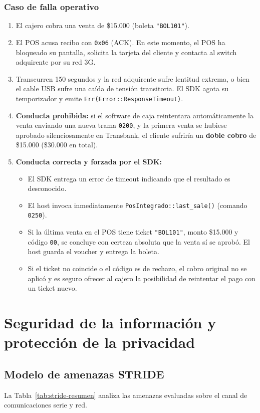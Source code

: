 \documentclass{../../plantilla/raysac-informe}
\begin{document}
\subsubsection{Caso de falla operativo}
\begin{enumerate}
  \item El cajero cobra una venta de \$15.000 (boleta \texttt{"BOL101"}).
  \item El POS acusa recibo con \texttt{0x06} (ACK). En este momento, el POS ha bloqueado su pantalla,
    solicita la tarjeta del cliente y contacta al switch adquirente por su red 3G.
  \item Transcurren 150 segundos y la red adquirente sufre lentitud extrema, o bien el cable USB sufre
    una caída de tensión transitoria. El SDK agota su temporizador y emite \texttt{Err(Error::ResponseTimeout)}.
  \item \textbf{Conducta prohibida:} si el software de caja reintentara automáticamente la venta enviando
    una nueva trama \texttt{0200}, y la primera venta se hubiese aprobado silenciosamente en Transbank,
    el cliente sufriría un \textbf{doble cobro} de \$15.000 (\$30.000 en total).
  \item \textbf{Conducta correcta y forzada por el SDK:}
    \begin{itemize}
      \item El SDK entrega un error de timeout indicando que el resultado es desconocido.
      \item El host invoca inmediatamente \texttt{PosIntegrado::last\_sale()} (comando \texttt{0250}).
      \item Si la última venta en el POS tiene ticket \texttt{"BOL101"}, monto \$15.000 y código \texttt{00},
        se concluye con certeza absoluta que la venta sí se aprobó. El host guarda el voucher y entrega la boleta.
      \item Si el ticket no coincide o el código es de rechazo, el cobro original no se aplicó y es seguro
        ofrecer al cajero la posibilidad de reintentar el pago con un ticket nuevo.
    \end{itemize}
\end{enumerate}

\clearpage
\section{Seguridad de la información y protección de la privacidad}

\subsection{Modelo de amenazas STRIDE}
La Tabla~\ref{tab:stride-resumen} analiza las amenazas evaluadas sobre el canal de comunicaciones serie y red.
\end{document}
